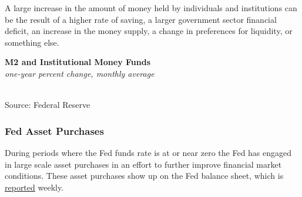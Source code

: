\documentclass{report}
\makeatletter
\newcommand{\tbllink}[1]{\href{https://raw.githubusercontent.com/bdecon/US-chartbook/master/chartbook/data/#1}{\faTable}}
\newcommand*\short[1]{\expandafter\@gobbletwo\number\numexpr#1\relax}
\newcommand{\dateaxisticks}{
		date coordinates in=x, axis line style={draw=none},
		xmax={2020-05-10},
		max space between ticks=40,	    
		xtick={{1990-01-01}, {1992-01-01}, {1994-01-01}, 
			{1996-01-01}, {1998-01-01}, {2000-01-01}, 
			{2002-01-01}, {2004-01-01}, {2006-01-01},
			{2008-01-01}, {2010-01-01}, {2012-01-01}, {2014-01-01},
		    {2016-01-01}, {2018-01-01}, {2020-01-01}},
		minor xtick={{1989-01-01}, {1991-01-01}, {1993-01-01},
			{1995-01-01}, {1997-01-01}, {1999-01-01}, 
			{2001-01-01}, {2003-01-01}, {2005-01-01}, {2007-01-01},
		    {2009-01-01}, {2011-01-01}, {2013-01-01}, {2015-01-01},
		    {2017-01-01}, {2019-01-01}},
		enlarge y limits={0.06}, enlarge x limits={0.01},
		}
\newcommand{\bbar}[2]{extra #1 ticks = {{#2}}, extra #1 tick labels = ,
		extra #1 tick style = {grid=major, grid style={thick, black!25}},}
\newcommand{\thickline}[4]{\addplot[ultra thick, no markers, color=#1] 
		table [x=#2, y=#3, col sep=comma] {#4};	}
\newcommand{\rbars}{
		\fill[color=black!10] (axis cs:{1990-07-01},\pgfkeysvalueof{/pgfplots/ymin}) rectangle 
			(axis cs:{1991-03-01}, \pgfkeysvalueof{/pgfplots/ymax});
		\fill[color=black!10] (axis cs:{2007-12-01},\pgfkeysvalueof{/pgfplots/ymin}) rectangle 
			(axis cs:{2009-07-01}, \pgfkeysvalueof{/pgfplots/ymax});
		\fill[color=black!10] (axis cs:{2001-03-01},\pgfkeysvalueof{/pgfplots/ymin}) rectangle 
			(axis cs:{2001-11-01}, \pgfkeysvalueof{/pgfplots/ymax});}
\makeatother
\begin{document}
{{{{{{{{{\begin{minipage}{0.76\textwidth}
A large increase in the amount of money held by individuals and institutions can be the result of a higher rate of saving, a larger government sector financial deficit, an increase in the money supply, a change in preferences for liquidity, or something else. \\

\vspace{2mm}

\noindent \normalsize \textbf{M2 and Institutional Money Funds}\\
\footnotesize{\textit{one-year percent change, monthly average}}\\ 
\noindent \hspace*{-2mm} \\
\footnotesize{Source: Federal Reserve} \hfill \tbllink{M2imf.csv}

\end{minipage}


\newpage

\subsubsection*{\color{black!70} \seriffont Fed Asset Purchases}

\begin{minipage}{0.76\textwidth}

\small During periods where the Fed funds rate is at or near zero the Fed has engaged in large scale asset purchases in an effort to further improve financial market conditions. These asset purchases show up on the Fed balance sheet, which is \href{https://www.federalreserve.gov/releases/h41/current/default.htm}{reported} weekly. \\



\end{minipage}

\begin{minipage}{0.39\textwidth}

\vspace{2mm}


\end{minipage}}}}}}}}}}
\end{document}
